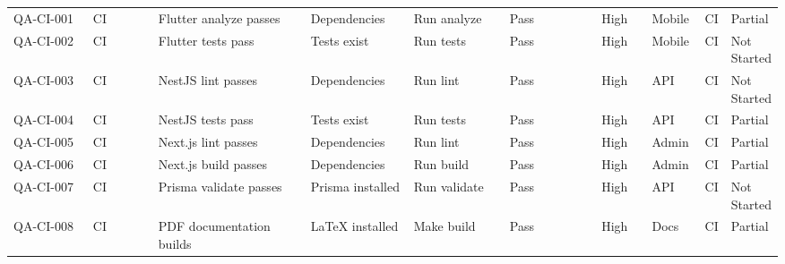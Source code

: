 \begin{longtable}{p{0.12\linewidth}p{0.1\linewidth}p{0.22\linewidth}p{0.14\linewidth}p{0.14\linewidth}p{0.14\linewidth}p{0.07\linewidth}p{0.08\linewidth}p{0.1\linewidth}p{0.08\linewidth}}
QA-CI-001 & CI & Flutter analyze passes & Dependencies & Run analyze & Pass & High & Mobile & CI & Partial \\
QA-CI-002 & CI & Flutter tests pass & Tests exist & Run tests & Pass & High & Mobile & CI & Not Started \\
QA-CI-003 & CI & NestJS lint passes & Dependencies & Run lint & Pass & High & API & CI & Not Started \\
QA-CI-004 & CI & NestJS tests pass & Tests exist & Run tests & Pass & High & API & CI & Partial \\
QA-CI-005 & CI & Next.js lint passes & Dependencies & Run lint & Pass & High & Admin & CI & Partial \\
QA-CI-006 & CI & Next.js build passes & Dependencies & Run build & Pass & High & Admin & CI & Partial \\
QA-CI-007 & CI & Prisma validate passes & Prisma installed & Run validate & Pass & High & API & CI & Not Started \\
QA-CI-008 & CI & PDF documentation builds & LaTeX installed & Make build & Pass & High & Docs & CI & Partial \\
\bottomrule
\end{longtable}
